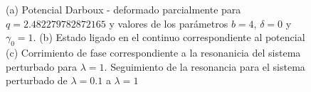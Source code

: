 \begin{figure}
	\centering
	\hfill%
	\hfill%
	\hfill%
	\caption{{\label{Figure-DPOA}} (a) Potencial Darboux - deformado parcialmente para $q=2.482279782872165$ y valores de los parámetros  $b=4$, $\delta=0$ y $\gamma_0=1$. (b) Estado ligado en el continuo correspondiente al potencial (c) Corrimiento de fase correspondiente a la resonanicia del sistema perturbado para $\lambda = 1$. Seguimiento de la resonancia para el sistema perturbado de $\lambda = 0.1$ a $\lambda = 1$ } \label{FOATTDP}
\end{figure}

